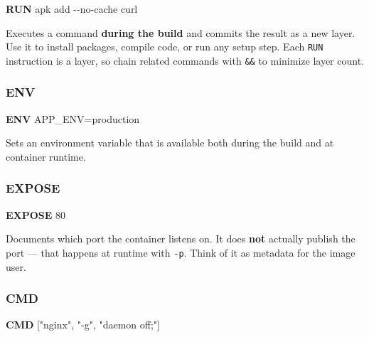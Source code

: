 \documentclass[11pt,american,a4paper,openany]{book}
\newenvironment{Shaded}{}{}
\newcommand{\AttributeTok}[1]{\textcolor[rgb]{0.49,0.56,0.16}{#1}}
\newcommand{\ExtensionTok}[1]{#1}
\newcommand{\KeywordTok}[1]{\textcolor[rgb]{0.00,0.44,0.13}{\textbf{#1}}}
\newcommand{\NormalTok}[1]{#1}
\newcommand{\StringTok}[1]{\textcolor[rgb]{0.25,0.44,0.63}{#1}}
\begin{document}
\begin{Shaded}
\begin{Highlighting}[]
\KeywordTok{RUN} \ExtensionTok{apk}\NormalTok{ add }\AttributeTok{{-}{-}no{-}cache}\NormalTok{ curl}
\end{Highlighting}
\end{Shaded}

Executes a command \textbf{during the build} and commits the result as a
new layer. Use it to install packages, compile code, or run any setup
step. Each \texttt{RUN} instruction is a layer, so chain related
commands with \texttt{\&\&} to minimize layer count.

\subsubsection{ENV}\label{env}

\begin{Shaded}
\begin{Highlighting}[]
\KeywordTok{ENV}\NormalTok{ APP\_ENV=production}
\end{Highlighting}
\end{Shaded}

Sets an environment variable that is available both during the build and
at container runtime.

\subsubsection{EXPOSE}\label{expose}

\begin{Shaded}
\begin{Highlighting}[]
\KeywordTok{EXPOSE}\NormalTok{ 80}
\end{Highlighting}
\end{Shaded}

Documents which port the container listens on. It does \textbf{not}
actually publish the port --- that happens at runtime with \texttt{-p}.
Think of it as metadata for the image user.

\subsubsection{CMD}\label{cmd}

\begin{Shaded}
\begin{Highlighting}[]
\KeywordTok{CMD}\NormalTok{ [}\StringTok{"nginx"}\NormalTok{, }\StringTok{"{-}g"}\NormalTok{, }\StringTok{"daemon off;"}\NormalTok{]}
\end{Highlighting}
\end{Shaded}
\end{document}
